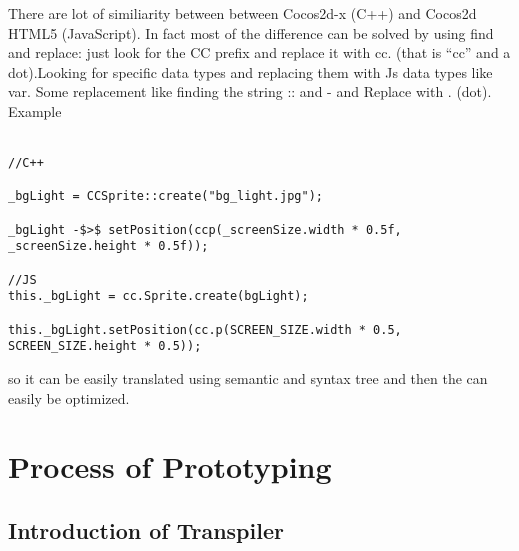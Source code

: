 \documentclass[23pt]{article}
\begin{document}
{\Large There are lot of similiarity between between Cocos2d-x (C++) and Cocos2d HTML5 (JavaScript). In fact  most of the difference can be solved by using find and replace: just look for the CC prefix and replace it with cc. (that is “cc” and a dot).Looking for specific data types and replacing them with Js data types like var. Some replacement like finding the string :: and - and Replace with . (dot). \\
Example \\  \\ \par}
\begin{lstlisting}[label=some-code,caption= Similarity between cocos2d-x c++ code and cocos2d-js code]
//C++
 
_bgLight = CCSprite::create("bg_light.jpg");
 
_bgLight -$>$ setPosition(ccp(_screenSize.width * 0.5f, _screenSize.height * 0.5f));
 
//JS
this._bgLight = cc.Sprite.create(bgLight);
 
this._bgLight.setPosition(cc.p(SCREEN_SIZE.width * 0.5, SCREEN_SIZE.height * 0.5));
\end{lstlisting}

{\Large so it can be easily translated using semantic and syntax tree and then the can easily be optimized. \cite{feasibility} \\ \par}

\section{Process of Prototyping}

\subsection{Introduction of Transpiler}
\end{document}
